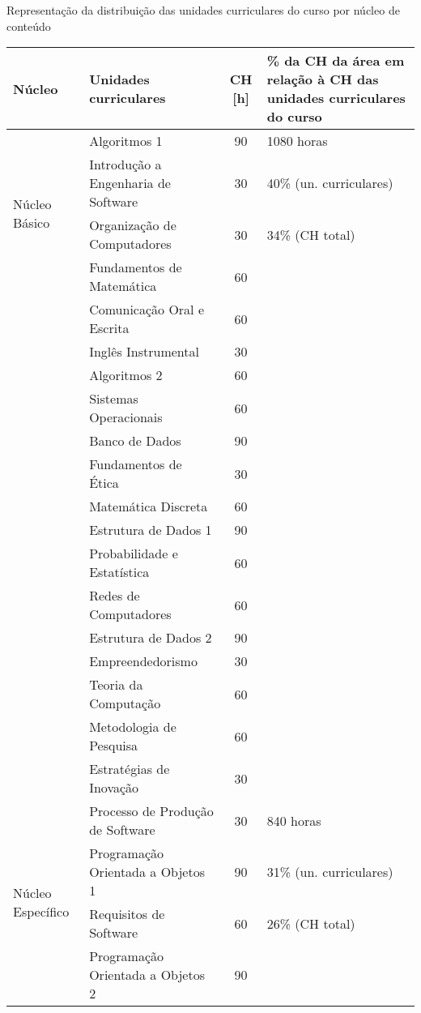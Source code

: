 
\begin{quadro}[ht!]
\caption{Representação da distribuição das unidades curriculares do curso por núcleo de conteúdo}
\label{tab:discarea}
\centering
\scriptsize
\begin{tabular}{|l|l|c|p{3.2cm}|}
\hline
\rowcolor{blue1}
Núcleo  & Unidades curriculares & CH [h]  & \% da CH da área em relação à CH das unidades curriculares do curso\\\hline
\multirow{4}{*}{Núcleo Básico} & Algoritmos 1 & 90 & 1080 horas  \\
\cline{2-3} & Introdução a Engenharia de Software & 30 & 40\% (un. curriculares)\\
\cline{2-3} & Organização de Computadores & 30 & 34\% (CH total)\\
\cline{2-3} & Fundamentos de Matemática & 60 & \\
\cline{2-3} & Comunicação Oral e Escrita & 60 & \\
\cline{2-3} & Inglês Instrumental & 30 & \\
\cline{2-3} & Algoritmos 2 & 60 & \\
\cline{2-3} & Sistemas Operacionais & 60 & \\
\cline{2-3} & Banco de Dados & 90 & \\
\cline{2-3} & Fundamentos de Ética & 30 & \\
\cline{2-3} & Matemática Discreta & 60 & \\
\cline{2-3} & Estrutura de Dados 1 & 90 & \\
\cline{2-3} & Probabilidade e Estatística & 60 & \\
\cline{2-3} & Redes de Computadores & 60 & \\
\cline{2-3} & Estrutura de Dados 2 & 90 & \\
\cline{2-3} & Empreendedorismo & 30 & \\
\cline{2-3} & Teoria da Computação & 60 & \\
\cline{2-3} & Metodologia de Pesquisa & 60 & \\
\cline{2-3} & Estratégias de Inovação & 30 & \\
\hline
\multirow{4}{*}{Núcleo Específico} & Processo de Produção de Software & 30 & 840 horas  \\
\cline{2-3} & Programação Orientada a Objetos 1  & 90 & 31\% (un. curriculares)\\
\cline{2-3} & Requisitos de Software & 60 & 26\% (CH total)\\
\cline{2-3} & Programação Orientada a Objetos 2 & 90 & \\

\end{tabular}
\end{quadro}

